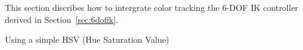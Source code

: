 This section discribes how to intergrate color tracking the 6-DOF IK controller derived in Section~\ref{sec:6dofik}.


Using a simple HSV (Hue Saturation Value) 
